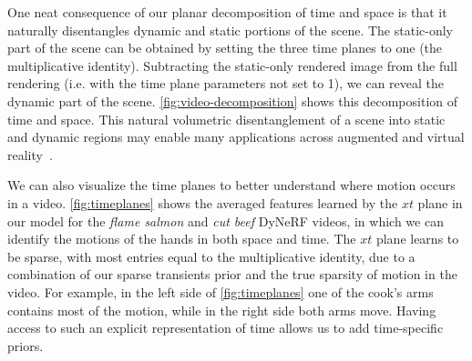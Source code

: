 \documentclass[10pt,twocolumn,letterpaper]{article}
\begin{document}
One neat consequence of our planar decomposition of time and space is that it naturally disentangles dynamic and static portions of the scene. The static-only part of the scene can be obtained by setting the three time planes to one (the multiplicative identity). Subtracting the static-only rendered image from the full rendering (i.e. with the time plane parameters not set to \num{1}), we can reveal the dynamic part of the scene.
\cref{fig:video-decomposition} shows this decomposition of time and space. This natural volumetric disentanglement of a scene into static and dynamic regions may enable many applications across augmented and virtual reality~\cite{volumentricdisentanglement}.

We can also visualize the time planes to better understand  where motion occurs in a video. \cref{fig:timeplanes} shows the averaged features learned by the $xt$ plane in our model for the \emph{flame salmon} and \emph{cut beef} DyNeRF videos, in which we can identify the motions of the hands in both space and time. 
The $xt$ plane learns to be sparse, with most entries equal to the multiplicative identity, due to a combination of our sparse transients prior and the true sparsity of motion in the video. For example, in the left side of \cref{fig:timeplanes} one of the cook's arms contains most of the motion, while in the right side both arms move. 
Having access to such an explicit representation of time allows us to add time-specific priors.
\end{document}
